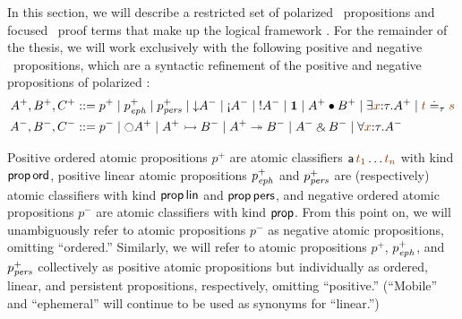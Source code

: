 In this section, we will describe a restricted set of polarized
\ollll~propositions and focused \ollll~proof terms that make up the
logical framework \sls. For the remainder of the thesis, we will work
exclusively with the following positive and negative
\sls~propositions, which are a syntactic refinement of the positive
and negative propositions of polarized \ollll:
\begin{align*}
A^+, B^+, C^+ & ::= p^+ \mid p^+_\meph \mid p^+_\mpers \mid {\downarrow}A^-
  \mid {\gnab}A^- \mid {!}A^- \mid \one \mid A^+ \fuse B^+
  \mid \exists \lf{x}{:}\tau.A^+ \mid \lf{t} \doteq_\tau \lf{s}
\\
A^-, B^-, C^- & ::= p^- \mid {\ocircle}A^+ \mid A^+ \lefti B^- 
  \mid A^+ \righti B^- \mid A^- \with B^-
  \mid \forall \lf{x}{:}\tau.A^-
\end{align*}


Positive ordered atomic propositions
$p^+$ are atomic classifiers ${\sf a}\,\lf{t_1}\ldots\lf{t_n}$ with
kind ${\sf prop}\,{\sf ord}$, positive linear atomic propositions
$p^+_{\it eph}$ and $p^+_{\it pers}$ are (respectively) atomic classifiers
with kind ${\sf prop}\,{\sf lin}$ and ${\sf prop}\,{\sf pers}$, and
negative ordered atomic propositions $p^-$ are atomic classifiers
with kind ${\sf prop}$.  From this point on,
we will unambiguously refer to atomic propositions $p^-$ as negative
atomic propositions, omitting ``ordered.'' Similarly, we will refer to
atomic propositions $p^+$, $p^+_{\it eph}$, and $p^+_{\it pers}$ collectively
as positive atomic propositions but individually as ordered, linear,
and persistent propositions, respectively, omitting ``positive.''
(``Mobile'' and ``ephemeral'' will continue to be used as synonyms for
``linear.'')

